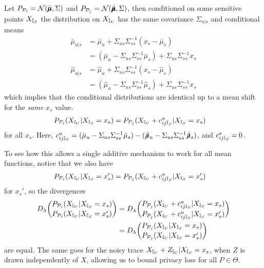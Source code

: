 Let $P_{\mathcal{P}_i} = \mathcal{N}(\bar{\pmb{\mu}}, \Sigma)$ and $P_{\calP_j} = \calN(\hat{\bmu}, \Sigma)$, then conditioned on some sensitive points ${X_{\mathbb{I}_S}}$ the distribution on ${X_{\mathbb{I}_U}}$ has the same covariance $\Sigma_{u|s}$ and conditional means 
\begin{align*}
	\bar{\mu}_{u|s}
	&= \bar{\mu}_u + \Sigma_{us} \Sigma_{ss}^{-1} (x_s - \bar{\mu}_s) \\
	&= (\bar{\mu}_u - \Sigma_{us} \Sigma_{ss}^{-1}\bar{\mu}_s) + \Sigma_{us} \Sigma_{ss}^{-1} x_s \\
	\hat{\mu}_{u|s}
	&= \hat{\mu}_u + \Sigma_{us} \Sigma_{ss}^{-1} (x_s - \hat{\mu}_s) \\
	&= (\hat{\mu}_u - \Sigma_{us} \Sigma_{ss}^{-1}\hat{\mu}_s) + \Sigma_{us} \Sigma_{ss}^{-1} x_s 
\end{align*}
which implies that the conditional distributions are identical up to a mean shift for the \emph{same} $x_s$ value. 
\begin{align*}
	P_{\mathcal{P}_i}({X_{\mathbb{I}_U}} | {X_{\mathbb{I}_S}} = x_s)
	&= P_{\mathcal{P}_j}({X_{\mathbb{I}_U}} + c_{ij{\mathbb{I}_S}}^u | {X_{\mathbb{I}_S}} = x_s)
\end{align*}
for all $x_s$. Here, $c_{ij\Is}^u = (\bar{\mu}_u - \Sigma_{us} \Sigma_{ss}^{-1}\bar{\mu}_s) - (\hat{\mu}_u - \Sigma_{us} \Sigma_{ss}^{-1}\hat{\mu}_s)$, and $c_{ij{\mathbb{I}_S}}^s = 0$. 

To see how this allows a single additive mechanism to work for all mean functions, notice that we also have 
\begin{align*}
	P_{\mathcal{P}_i}({X_{\mathbb{I}_U}} | {X_{\mathbb{I}_S}} = x_s')
	&= P_{\mathcal{P}_j}({X_{\mathbb{I}_U}} + c_{ij{\mathbb{I}_S}}^u | {X_{\mathbb{I}_S}} = x_s')
\end{align*}
for $x_s'$, so the divergences 
\begin{align*}
	D_\lambda \binom{P_{\mathcal{P}_i}({X_{\mathbb{I}_U}} | {X_{\mathbb{I}_S}} = x_s)}{P_{\mathcal{P}_i}({X_{\mathbb{I}_U}} | {X_{\mathbb{I}_S}} = x_s')}
	&= D_\lambda \binom{P_{\mathcal{P}_j}({X_{\mathbb{I}_U}} + c_{ij{\mathbb{I}_S}}^u | {X_{\mathbb{I}_S}} = x_s)}{P_{\mathcal{P}_j}({X_{\mathbb{I}_U}} + c_{ij{\mathbb{I}_S}}^u | {X_{\mathbb{I}_S}} = x_s')} \\
	&= D_\lambda \binom{P_{\mathcal{P}_j}({X_{\mathbb{I}_U}}  | {X_{\mathbb{I}_S}} = x_s)}{P_{\mathcal{P}_j}({X_{\mathbb{I}_U}}  | {X_{\mathbb{I}_S}} = x_s')}
\end{align*}
are equal. The same goes for the noisy trace ${X_{\mathbb{I}_U}} + {Z_{\mathbb{I}_U}} | {X_{\mathbb{I}_S}} = x_s$, when $Z$ is drawn independently of $X$, allowing us to bound privacy loss for all $P \in \Theta$. 







